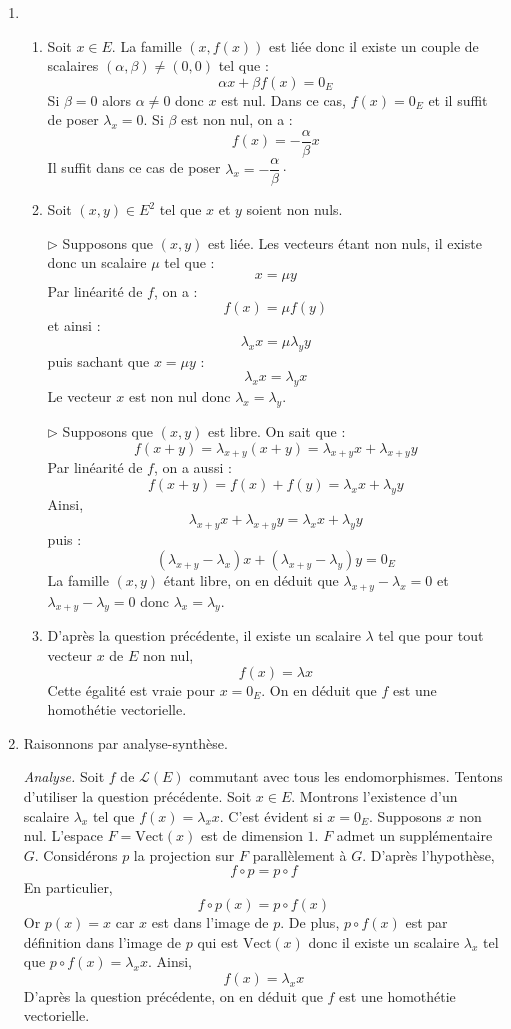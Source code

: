 \documentclass[a4paper,10pt]{report}
\begin{document}
\corr 
\begin{enumerate}
\item 
\begin{enumerate}
\item Soit $x \in E$. La famille $(x, f(x))$ est liée donc il existe un couple de scalaires $(\alpha, \beta) \neq (0,0)$ tel que :
$$ \alpha x + \beta f(x) = 0_E$$
Si $\beta=0$ alors $\alpha \neq 0$ donc $x$ est nul. Dans ce cas, $f(x)=0_E$ et il suffit de poser $\lambda_x=0$. Si $\beta$ est non nul, on a :
$$ f(x) = - \dfrac{\alpha}{\beta} x$$
Il suffit dans ce cas de poser $\lambda_x = - \dfrac{\alpha}{\beta} \cdot$
\item Soit $(x,y) \in E^2$ tel que $x$ et $y$ soient non nuls.

\medskip

\noindent $\rhd$ Supposons que $(x,y)$ est liée. Les vecteurs étant non nuls, il existe donc un scalaire $\mu$ tel que :
$$ x = \mu y$$
Par linéarité de $f$, on a :
$$ f(x) = \mu f(y)$$
et ainsi :
$$ \lambda_x x = \mu \lambda_y  y$$
puis sachant que $x= \mu y$ :
$$ \lambda_x x = \lambda_y  x$$
Le vecteur $x$ est non nul donc $\lambda_x = \lambda_y$.

\medskip

\noindent $\rhd$ Supposons que $(x,y)$ est libre. On sait que :
$$ f(x+y) = \lambda_{x+y} (x+y) = \lambda_{x+y} x + \lambda_{x+y} y$$
Par linéarité de $f$, on a aussi :
$$ f(x+y) = f(x) + f(y) = \lambda_x x + \lambda_y y$$
Ainsi,
$$ \lambda_{x+y} x + \lambda_{x+y} y = \lambda_x x + \lambda_y y$$
puis :
$$ (\lambda_{x+y}- \lambda_x) x + (\lambda_{x+y}-\lambda_y) y =0_E$$
La famille $(x,y)$ étant libre, on en déduit que $\lambda_{x+y}- \lambda_x=0$ et $\lambda_{x+y}- \lambda_y=0$ donc $\lambda_x= \lambda_y$.
\item D'après la question précédente, il existe un scalaire $\lambda$ tel que pour tout vecteur $x$ de $E$ non nul,
$$ f(x)= \lambda x$$
Cette égalité est vraie pour $x=0_E$. On en déduit que $f$ est une homothétie vectorielle.
\end{enumerate}
\item Raisonnons par analyse-synthèse.

\medskip

\noindent \textit{Analyse.} Soit $f$ de $\mathcal{L}(E)$ commutant avec tous les endomorphismes. Tentons d'utiliser la question précédente. Soit $x \in E$. Montrons l'existence d'un scalaire $\lambda_x$ tel que $f(x)= \lambda_x x$. C'est évident si $x=0_E$. Supposons $x$ non nul. L'espace $F= \textrm{Vect}(x)$ est de dimension $1$. $F$ admet un supplémentaire $G$. Considérons $p$ la projection sur $F$ parallèlement à $G$. D'après l'hypothèse,
$$ f \circ p = p \circ f$$
En particulier,
$$ f \circ p (x) = p \circ f(x)$$
Or $p(x)=x$ car $x$ est dans l'image de $p$. De plus, $p \circ f(x)$ est par définition dans l'image de $p$ qui est $\textrm{Vect}(x)$ donc il existe un scalaire $\lambda_x$ tel que $p \circ f(x) = \lambda_x x$. Ainsi,
$$ f(x) = \lambda_x x$$
D'après la question précédente, on en déduit que $f$ est une homothétie vectorielle.


\end{enumerate}
\end{document}
